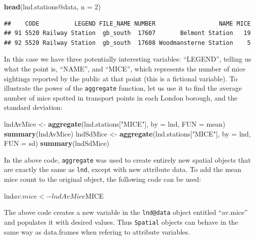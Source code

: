 \documentclass[]{article}
\newenvironment{Shaded}{}{}
\newcommand{\KeywordTok}[1]{\textcolor[rgb]{0.00,0.44,0.13}{\textbf{{#1}}}}
\newcommand{\DataTypeTok}[1]{\textcolor[rgb]{0.56,0.13,0.00}{{#1}}}
\newcommand{\DecValTok}[1]{\textcolor[rgb]{0.25,0.63,0.44}{{#1}}}
\newcommand{\StringTok}[1]{\textcolor[rgb]{0.25,0.44,0.63}{{#1}}}
\newcommand{\NormalTok}[1]{{#1}}
\begin{document}
\begin{Shaded}
\begin{Highlighting}[]
\KeywordTok{head}\NormalTok{(lnd.stations@data, }\DataTypeTok{n =} \DecValTok{2}\NormalTok{)}
\end{Highlighting}
\end{Shaded}
\begin{verbatim}
##    CODE          LEGEND FILE_NAME NUMBER                  NAME MICE
## 91 5520 Railway Station  gb_south  17607       Belmont Station   19
## 92 5520 Railway Station  gb_south  17608 Woodmansterne Station    5
\end{verbatim}
In this case we have three potentially interesting variables:
``LEGEND'', telling us what the point is, ``NAME'', and ``MICE'', which
represents the number of mice sightings reported by the public at that
point (this is a fictional variable). To illustrate the power of the
\texttt{aggregate} function, let us use it to find the average number of
mice spotted in transport points in each London borough, and the
standard deviation:

\begin{Shaded}
\begin{Highlighting}[]
\NormalTok{lndAvMice <- }\KeywordTok{aggregate}\NormalTok{(lnd.stations[}\StringTok{"MICE"}\NormalTok{], }\DataTypeTok{by =} \NormalTok{lnd, }\DataTypeTok{FUN =} \NormalTok{mean)}
\KeywordTok{summary}\NormalTok{(lndAvMice)}
\NormalTok{lndSdMice <- }\KeywordTok{aggregate}\NormalTok{(lnd.stations[}\StringTok{"MICE"}\NormalTok{], }\DataTypeTok{by =} \NormalTok{lnd, }\DataTypeTok{FUN =} \NormalTok{sd)}
\KeywordTok{summary}\NormalTok{(lndSdMice)}
\end{Highlighting}
\end{Shaded}
In the above code, \texttt{aggregate} was used to create entirely new
spatial objects that are exactly the same as \texttt{lnd}, except with
new attribute data. To add the mean mice count to the original object,
the following code can be used:

\begin{Shaded}
\begin{Highlighting}[]
\NormalTok{lnd$av.mice <- lndAvMice$MICE}
\end{Highlighting}
\end{Shaded}
The above code creates a new variable in the \texttt{lnd@data} object
entitled ``av.mice'' and populates it with desired values. Thus
\texttt{Spatial} objects can behave in the same way as data.frames when
refering to attribute variables.
\end{document}
